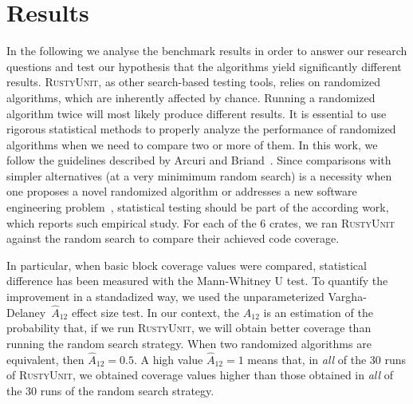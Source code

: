 \documentclass[paper=a4,%
  twoside,%
  BCOR4mm,%
  abstract=true,%
  toc=bibliography,%
  chapterprefix=true,%
  toc=bibliographynumbered,%
  open=right,%
  english,%
  pagesize=pdftex]{scrreprt}
\newcommand{\benchnum}{6\xspace}
\newcommand{\tech}{\textsc{RustyUnit}\xspace}
\newcommand{\runs}{30\xspace}
\begin{document}
\section{Results}
\label{sec:results}
In the following we analyse the benchmark results in order to answer our research questions and test our hypothesis that the algorithms yield significantly different results. \tech, as other search-based testing tools, relies on randomized algorithms, which are inherently affected by chance. Running a randomized algorithm twice will most likely produce different results. It is essential to use rigorous statistical methods to properly analyze the performance of randomized algorithms when we need to compare two or more of them. In this work, we follow the guidelines described by Arcuri and Briand~\cite{Arcuri2011}. Since comparisons with simpler alternatives (at a very minimimum random search) is a necessity when one proposes a novel randomized algorithm or addresses a new software engineering problem~\cite{Ali2010}, statistical testing should be part of the according work, which reports such empirical study. For each of the \benchnum crates, we ran \tech against the random search to compare their achieved code coverage.   %

In particular, when basic block coverage values were compared, statistical difference has been measured with the Mann-Whitney U test. To quantify the improvement in a standadized way, we used the unparameterized Vargha-Delaney~$\hat{A}_{12}$ effect size test. In our context, the $\hat{A}_{12}$ is an estimation of the probability that, if we run \tech, we will obtain better coverage than running the random search strategy. When two randomized algorithms are equivalent, then $\hat{A}_{12} = 0.5$. A high value $\hat{A}_{12} = 1$ means that, in \emph{all} of the \runs runs of \tech, we obtained coverage values higher than those obtained in \emph{all} of the \runs runs of the random search strategy.
\end{document}
